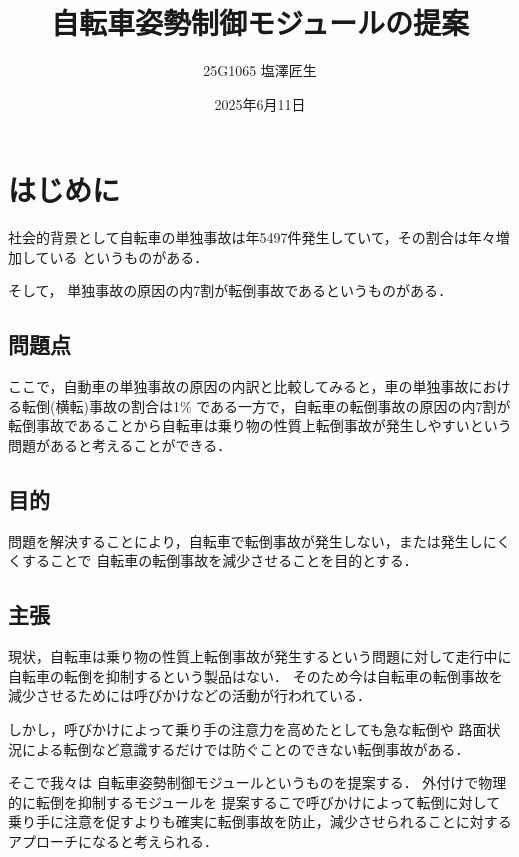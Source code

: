 \documentclass[uplatex,dvipdfmx]{jsarticle}
\begin{document}
\title{自転車姿勢制御モジュールの提案}
\author{25G1065 塩澤匠生}
\date{2025年6月11日}
\maketitle
\section{はじめに}

社会的背景として自転車の単独事故は年5497件発生していて，その割合は年々増加している
というものがある\cite{jikokensuu}．

そして，
単独事故の原因の内7割が転倒事故であるというものがある\cite{tandokuWariai}．

\subsection{問題点}

ここで，自動車の単独事故の原因の内訳と比較してみると，車の単独事故における転倒(横転)事故の割合は1\%
である一方で，自転車の転倒事故の原因の内7割が転倒事故であることから自転車は乗り物の性質上転倒事故が発生しやすいという問題があると考えることができる．


\subsection{目的}
問題を解決することにより，自転車で転倒事故が発生しない，または発生しにくくすることで
自転車の転倒事故を減少させることを目的とする．

\subsection{主張}

現状，自転車は乗り物の性質上転倒事故が発生するという問題に対して走行中に自転車の転倒を抑制するという製品はない．
そのため今は自転車の転倒事故を減少させるためには呼びかけなどの活動が行われている．

しかし，呼びかけによって乗り手の注意力を高めたとしても急な転倒や
路面状況による転倒など意識するだけでは防ぐことのできない転倒事故がある．

そこで我々は
自転車姿勢制御モジュールというものを提案する．
外付けで物理的に転倒を抑制するモジュールを
提案するこで呼びかけによって転倒に対して
乗り手に注意を促すよりも確実に転倒事故を防止，減少させられることに対する
アプローチになると考えられる．
\end{document}
